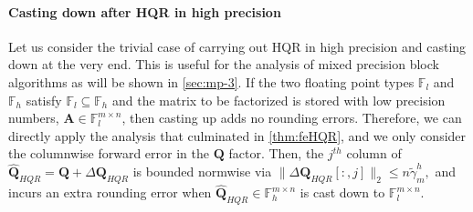 \documentclass[review,onefignum,onetabnum]{siamart190516}
\newcommand{\R}{\mathbb{R}}
\newcommand{\F}{\mathbb{F}}
\newcommand{\dd}{\delta}
\newcommand{\bb}[1]{\mathbf{#1}}
\begin{document}
\paragraph{Casting down after HQR in high precision} Let us consider the trivial case of carrying out HQR in high precision and casting down at the very end.
This is useful for the analysis of mixed precision
block algorithms as will be shown in \cref{sec:mp-3}.
If the two floating point types $\F_{l}$ and $\F_{h}$ satisfy $\F_{l}\subseteq \F_{h}$
and the matrix to be factorized is stored with low precision numbers, $\bb{A}\in\F_{l}^{m\times n}$, then casting up adds no rounding errors.
Therefore, we can directly apply the analysis that culminated in \cref{thm:feHQR}, and we only consider the columnwise forward error in the $\bb{Q}$ factor.
Then, the $j^{th}$ column of $\hat{\bb{Q}}_{HQR} = \bb{Q} + \Delta \bb{Q}_{HQR}$ is bounded normwise via $\|\Delta \bb{Q}_{HQR}[:,j]\|_2 \leq n\tilde{\gamma}_{m}^{h},$ and incurs an extra rounding error when $\hat{\bb{Q}}_{HQR}\in\F_{h}^{m\times n}$ is cast down to $\F_{l}^{m\times n}$.
\end{document}
